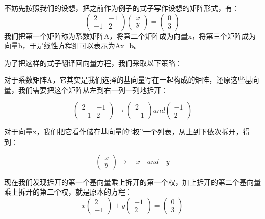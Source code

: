\documentclass[12pt,a4paper]{book}
\begin{document}
{\subsubsection{\centering\fontsize{20pt}{15pt}}}
不妨先按照我们的设想，把之前作为例子的式子写作设想的矩阵形式，有：
\[
\begin{pmatrix}
2&-1\\
-1&2
\end{pmatrix}
\begin{pmatrix}
x\\
y
\end{pmatrix}
=
\begin{pmatrix}
0\\
3
\end{pmatrix}
\]
我们把第一个矩阵称为系数矩阵A，将第二个矩阵成为向量x，将第三个矩阵成为向量b，于是线性方程组可以表示为Ax=b。

为了把这样的式子翻译回向量方程，我们采取以下策略：

对于系数矩阵A，它其实是我们选择的基向量写在一起构成的矩阵，还原这些基向量，我们需要把这个矩阵从左到右一列一列地拆开：

\[
\begin{pmatrix}
2&-1\\
-1&2
\end{pmatrix}
\rightarrow
\begin{pmatrix}
2\\
-1
\end{pmatrix}
and
\begin{pmatrix}
-1\\
2
\end{pmatrix}
\]

对于向量x，我们把它看作储存基向量的“权”一个列表，从上到下依次拆开，得到：

\[
\begin{pmatrix}
x\\
y
\end{pmatrix}
\rightarrow
\quad x \quad and \quad y
\]

现在我们发现拆开的第一个基向量乘上拆开的第一个权，加上拆开的第二个基向量乘上拆开的第二个权，就是原本的方程：
\[
x
\begin{pmatrix}
2\\
-1
\end{pmatrix}
+y
\begin{pmatrix}
-1\\
2
\end{pmatrix}
=
\begin{pmatrix}
0\\
3
\end{pmatrix}
\]
\end{document}
